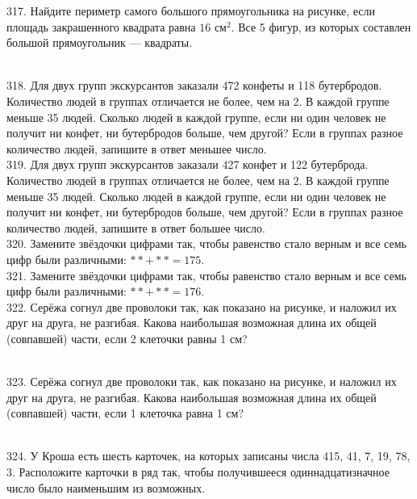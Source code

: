 317. Найдите периметр самого большого прямоугольника на рисунке, если площадь закрашенного квадрата равна $16\text{ см}^2.$ Все 5 фигур, из которых составлен большой прямоугольник --- квадраты.\\
\begin{figure}[ht!]
\end{figure}\\
318. Для двух групп экскурсантов заказали 472 конфеты и 118 бутербродов. Количество людей в группах отличается не более, чем на 2. В каждой группе меньше 35 людей. Сколько людей в каждой группе, если ни один человек не получит ни конфет, ни бутербродов больше, чем другой? Если в группах разное количество людей, запишите в ответ меньшее число.\\
319. Для двух групп экскурсантов заказали 427 конфет и 122 бутерброда. Количество людей в группах отличается не более, чем на 2. В каждой группе меньше 35 людей. Сколько людей в каждой группе, если ни один человек не получит ни конфет, ни бутербродов больше, чем другой? Если в группах разное количество людей, запишите в ответ большее число.\\
320. Замените звёздочки цифрами так, чтобы равенство стало верным и все семь цифр были различными: $**+**=175.$\\
321. Замените звёздочки цифрами так, чтобы равенство стало верным и все семь цифр были различными: $**+**=176.$\\
322. Серёжа согнул две проволоки так, как показано на рисунке, и наложил их друг на друга, не разгибая. Какова наибольшая возможная длина их общей (совпавшей) части, если 2 клеточки равны 1 см?\\
\begin{figure}[ht!]
\end{figure}\\
323. Серёжа согнул две проволоки так, как показано на рисунке, и наложил их друг на друга, не разгибая. Какова наибольшая возможная длина их общей (совпавшей) части, если 1 клеточка равна 1 см?\\
\begin{figure}[ht!]
\end{figure}\\
324. У Кроша есть шесть карточек, на которых записаны числа 415, 41, 7, 19, 78, 3. Расположите карточки в ряд так, чтобы получившееся одиннадцатизначное число было наименьшим из возможных.\\
